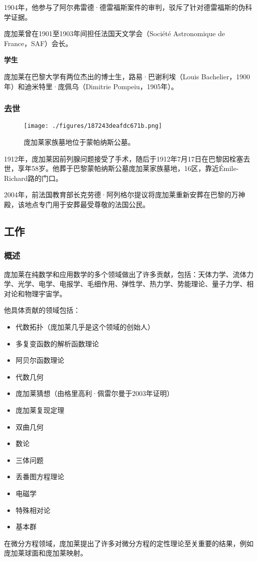 1904年，他参与了阿尔弗雷德·德雷福斯案件的审判，驳斥了针对德雷福斯的伪科学证据。

庞加莱曾在1901至1903年间担任法国天文学会（Société Astronomique de France，SAF）会长。

\textbf{学生}

庞加莱在巴黎大学有两位杰出的博士生，路易·巴谢利埃（Louis Bachelier，1900年）和迪米特里·庞佩乌（Dimitrie Pompeiu，1905年）。

\subsubsection{去世}
\begin{figure}[ht]
\centering
\texttt{[image: ./figures/187243deafdc671b.png]}
\caption{庞加莱家族墓地位于蒙帕纳斯公墓。} \label{fig_HLPJL_3}
\end{figure}
1912年，庞加莱因前列腺问题接受了手术，随后于1912年7月17日在巴黎因栓塞去世，享年58岁。他葬于巴黎蒙帕纳斯公墓庞加莱家族墓地，16区，靠近Émile-Richard路的门口。

2004年，前法国教育部长克劳德·阿列格尔提议将庞加莱重新安葬在巴黎的万神殿，该地点专门用于安葬最受尊敬的法国公民。
\subsection{工作}
\subsubsection{概述}
庞加莱在纯数学和应用数学的多个领域做出了许多贡献，包括：天体力学、流体力学、光学、电学、电报学、毛细作用、弹性学、热力学、势能理论、量子力学、相对论和物理宇宙学。

他具体贡献的领域包括：
\begin{itemize}
\item 代数拓扑（庞加莱几乎是这个领域的创始人）
\item 多复变函数的解析函数理论
\item 阿贝尔函数理论
\item 代数几何
\item 庞加莱猜想（由格里高利·佩雷尔曼于2003年证明）
\item 庞加莱复现定理
\item 双曲几何
\item 数论
\item 三体问题
\item 丢番图方程理论
\item 电磁学
\item 特殊相对论
\item 基本群
\end{itemize}
在微分方程领域，庞加莱提出了许多对微分方程的定性理论至关重要的结果，例如庞加莱球面和庞加莱映射。


